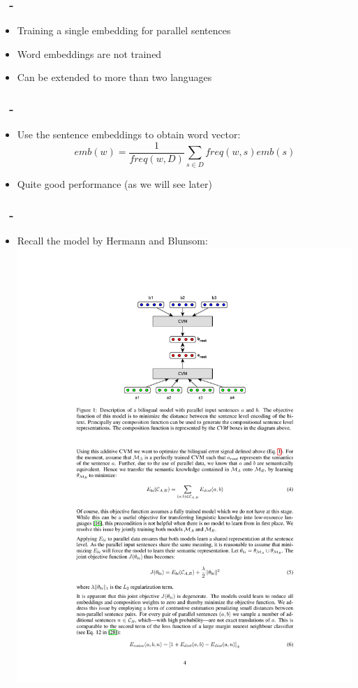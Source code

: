 \documentclass{beamer}
\newenvironment{dia}
{
\begin{frame}[fragile, environment=dia]
\frametitle{\insertsection
\ifx\insertsubsection\empty\else
      \,~-~\insertsubsection             %
   \fi}
}
{
\end{frame}
}
\begin{document}
\begin{dia}
\begin{itemize}
\item Training a single embedding for parallel sentences
\item Word embeddings are not trained
\item Can be extended to more than two languages
\end{itemize}
\end{dia}

\begin{dia}
\begin{itemize}
\item Use the sentence embeddings to obtain word vector: 
\begin{equation*}
emb(w)=\frac{1}{freq(w,D)}\sum_{s\in D}freq(w,s) emb(s)
\end{equation*}
\item Quite good performance (as we will see later)
\end{itemize}
\end{dia}

\begin{dia}
\begin{itemize}
\item Recall the model by Hermann and Blunsom: 
\includegraphics[width=.7\linewidth]{figures/hermannBlunsom}
\end{itemize}
\end{dia}
\end{document}

